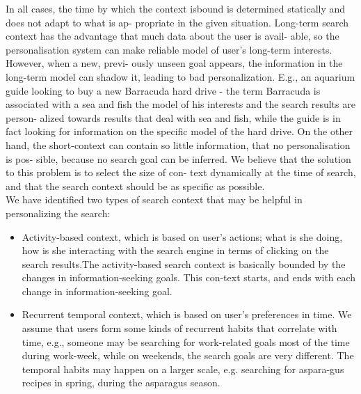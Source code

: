 \documentclass{acm_proc_article-sp} %
\begin{document}
 In all cases, the time by which the context isbound is
determined statically and does not adapt to what is ap-
propriate in the given situation. Long-term search context
has the advantage that much data about the user is avail-
able, so the personalisation system can make reliable model
of user's long-term interests. However, when a new, previ-
ously unseen goal appears, the information in the long-term
model can shadow it, leading to bad personalization. E.g.,
an aquarium guide looking to buy a new Barracuda hard
drive - the term Barracuda is associated with a sea and fish the model of his interests and the search results are person-
alized towards results that deal with sea and fish, while the
guide is in fact looking for information on the specific model
of the hard drive. On the other hand, the short-context can
contain so little information, that no personalisation is pos-
sible, because no search goal can be inferred. We believe
that the solution to this problem is to select the size of con-
text dynamically at the time of search, and that the search
context should be as specific as possible.
\\
 We have identified two types of search context that may be helpful in personalizing the search:
 \begin{itemize}
\item
 Activity-based context, which is based   on user's actions;
 what is she doing, how is she interacting with the search engine in terms of clicking on the search results.The activity-based search context is basically bounded by the changes in information-seeking goals. This con-text starts, and ends with each change in information-seeking goal.
\item 
 Recurrent temporal context, which is based on user's
 preferences in time. We assume that users form some
 kinds of recurrent habits that correlate with time, e.g.,
 someone may be searching for work-related goals most
 of the time during work-week, while on weekends, the
 search goals are very different. The temporal habits may happen on a larger scale, e.g. searching for aspara-gus recipes in spring, during the asparagus season.
 \end{itemize}
\end{document}
